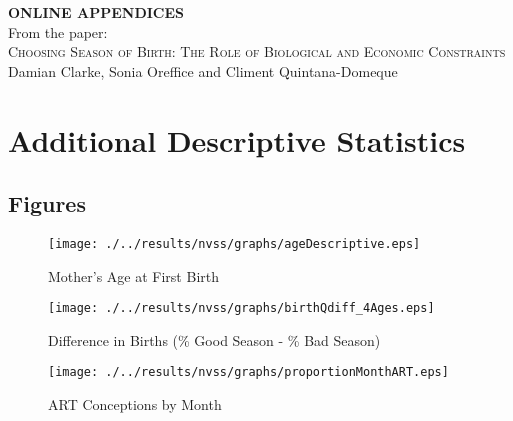 \documentclass[a4paper, 12 pt]{article}
\theoremstyle{plain}
\begin{document}
\begin{spacing}{1.4}
\begin{center}
\textbf{ONLINE APPENDICES} \\
\vspace{4mm}
From the paper: \\
\vspace{6mm}
{\large \textsc{Choosing Season of Birth:
The Role of Biological and Economic Constraints}} \\
Damian Clarke, Sonia Oreffice and Climent Quintana-Domeque
\end{center}

\tableofcontents


\setlength\parindent{0.25in}
\setlength\parskip{0.25in}




\newpage
\section{Additional Descriptive Statistics}
\subsection{Figures}
\begin{figure}[htpb!]
  \begin{center}
    \caption{Mother's Age at First Birth}
    \label{bqFig:NVSSages}
    \texttt{[image: ./../results/nvss/graphs/ageDescriptive.eps]}
  \end{center}
\end{figure}

\begin{figure}[htpb!]
  \begin{center}
    \caption{Difference in Births (\% Good Season - \% Bad Season)}
    \label{fig:NVSSbirthsAges}
    \texttt{[image: ./../results/nvss/graphs/birthQdiff\_4Ages.eps]}
  \end{center}
\end{figure}

\begin{figure}[htpb!]
  \begin{center}
    \centering
    \caption{ART Conceptions by Month}
    \texttt{[image: ./../results/nvss/graphs/proportionMonthART.eps]}
    \label{fig:ARTMonth}
  \end{center}
\end{figure}



\end{spacing}
\end{document}
